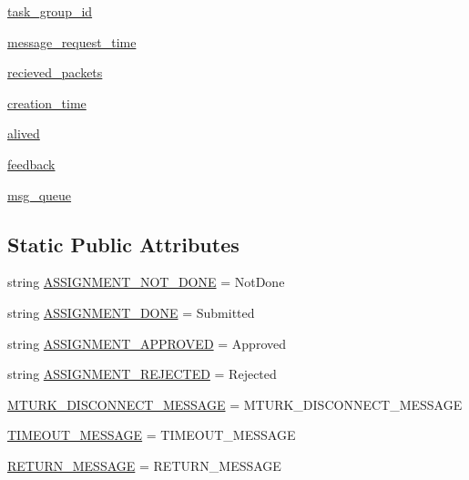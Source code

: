 \begin{DoxyCompactItemize}
\hyperlink{classparlai_1_1mturk_1_1core_1_1agents_1_1MTurkAgent_abf512fbe295ddca93d2489fc5abe4732}{task\+\_\+group\+\_\+id}
\item 
\hyperlink{classparlai_1_1mturk_1_1core_1_1agents_1_1MTurkAgent_afb1d5e2911271fa42cc27e909681090a}{message\+\_\+request\+\_\+time}
\item 
\hyperlink{classparlai_1_1mturk_1_1core_1_1agents_1_1MTurkAgent_afe0dd76c6399e61f4b7a8cd2f439b217}{recieved\+\_\+packets}
\item 
\hyperlink{classparlai_1_1mturk_1_1core_1_1agents_1_1MTurkAgent_aebcc59e3917d5227522e745503f2e813}{creation\+\_\+time}
\item 
\hyperlink{classparlai_1_1mturk_1_1core_1_1agents_1_1MTurkAgent_a97121ee3185b8a5e16da522d115035ca}{alived}
\item 
\hyperlink{classparlai_1_1mturk_1_1core_1_1agents_1_1MTurkAgent_afc4c17ac00ca8efec5cc2cb6aea88765}{feedback}
\item 
\hyperlink{classparlai_1_1mturk_1_1core_1_1agents_1_1MTurkAgent_a789680932f68f3bef45e3ee19d0dc7aa}{msg\+\_\+queue}
\end{DoxyCompactItemize}
\subsection*{Static Public Attributes}
\begin{DoxyCompactItemize}
\item 
string \hyperlink{classparlai_1_1mturk_1_1core_1_1agents_1_1MTurkAgent_aadd800907f07e903f225a863a5c2c9b6}{A\+S\+S\+I\+G\+N\+M\+E\+N\+T\+\_\+\+N\+O\+T\+\_\+\+D\+O\+NE} = \textquotesingle{}Not\+Done\textquotesingle{}
\item 
string \hyperlink{classparlai_1_1mturk_1_1core_1_1agents_1_1MTurkAgent_a54a69f80ece38725d94d898d0e3c3d30}{A\+S\+S\+I\+G\+N\+M\+E\+N\+T\+\_\+\+D\+O\+NE} = \textquotesingle{}Submitted\textquotesingle{}
\item 
string \hyperlink{classparlai_1_1mturk_1_1core_1_1agents_1_1MTurkAgent_a7503ace3969c40736feec5d23a0ab749}{A\+S\+S\+I\+G\+N\+M\+E\+N\+T\+\_\+\+A\+P\+P\+R\+O\+V\+ED} = \textquotesingle{}Approved\textquotesingle{}
\item 
string \hyperlink{classparlai_1_1mturk_1_1core_1_1agents_1_1MTurkAgent_a7641524d9b7f2cf8773f36b46a2b68f1}{A\+S\+S\+I\+G\+N\+M\+E\+N\+T\+\_\+\+R\+E\+J\+E\+C\+T\+ED} = \textquotesingle{}Rejected\textquotesingle{}
\item 
\hyperlink{classparlai_1_1mturk_1_1core_1_1agents_1_1MTurkAgent_a027f6f120329eca8a49893e0071042b9}{M\+T\+U\+R\+K\+\_\+\+D\+I\+S\+C\+O\+N\+N\+E\+C\+T\+\_\+\+M\+E\+S\+S\+A\+GE} = M\+T\+U\+R\+K\+\_\+\+D\+I\+S\+C\+O\+N\+N\+E\+C\+T\+\_\+\+M\+E\+S\+S\+A\+GE
\item 
\hyperlink{classparlai_1_1mturk_1_1core_1_1agents_1_1MTurkAgent_a3e24e99c772d13e949f46ac35def1b96}{T\+I\+M\+E\+O\+U\+T\+\_\+\+M\+E\+S\+S\+A\+GE} = T\+I\+M\+E\+O\+U\+T\+\_\+\+M\+E\+S\+S\+A\+GE
\item 
\hyperlink{classparlai_1_1mturk_1_1core_1_1agents_1_1MTurkAgent_abb50a0000f9615b87a56af128abe1c00}{R\+E\+T\+U\+R\+N\+\_\+\+M\+E\+S\+S\+A\+GE} = R\+E\+T\+U\+R\+N\+\_\+\+M\+E\+S\+S\+A\+GE
\end{DoxyCompactItemize}


